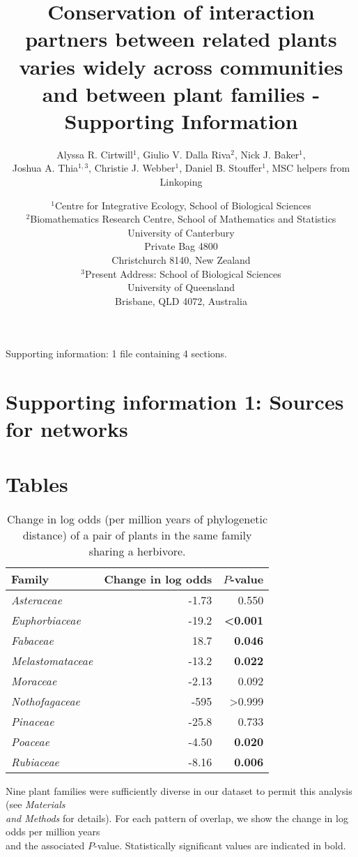 \documentclass[12pt]{article}
\title{Conservation of interaction partners between related plants varies widely across communities and between plant families - Supporting Information}
\author{Alyssa R. Cirtwill$^{1}$, Giulio V. Dalla Riva$^{2}$, Nick J. Baker$^{1}$,\\
 Joshua A. Thia$^{1,3}$, Christie J. Webber$^{1}$, Daniel B. Stouffer$^{1}$, MSC helpers from Linkoping}
\date{\small$^1$Centre for Integrative Ecology, School of Biological Sciences\\
    \medskip$^2$Biomathematics Research Centre, School of Mathematics and Statistics\\
            University of Canterbury\\Private Bag 4800\\
Christchurch 8140, New Zealand\\
\medskip$^3$Present Address: School of Biological Sciences\\
University of Queensland\\Brisbane, QLD 4072, Australia }
\begin{document}
\maketitle
\baselineskip=8.5mm
\begin{spacing}{1.0}


Supporting information: 1 file containing 4 sections.

\section*{Supporting information 1: Sources for networks}




\end{spacing}

\newpage

\renewcommand*{\bibfont}{\raggedright}



\newpage
\section*{Tables}

  \begin{table}[!h]
  \caption{\small Change in log odds (per million years of phylogenetic distance) of a pair of plants in the same family sharing a herbivore.}
  \label{family_slopes_ph}
  \begin{tabular}{|l  rr|}
  \hline
    Family & Change in log odds & $P$-value \\
    \hline
    \emph{Asteraceae} & -1.73 &  0.550 \\
    \emph{Euphorbiaceae} & -19.2 & \textbf{\textless0.001} \\
    \emph{Fabaceae} & 18.7 &  \textbf{0.046} \\
    \emph{Melastomataceae} & -13.2 & \textbf{0.022} \\
    \emph{Moraceae} & -2.13 & 0.092 \\
    \emph{Nothofagaceae} & -595 & \textgreater{0.999} \\
    \emph{Pinaceae} &  -25.8 & 0.733 \\
    \emph{Poaceae} & -4.50 & \textbf{0.020} \\
    \emph{Rubiaceae} & -8.16 &  \textbf{0.006} \\
  \hline
  \end{tabular}
  \smallskip
  \footnotesize

  Nine plant families were sufficiently diverse in our  dataset to permit this analysis
  (see \emph{Materials \\and Methods} for details). For each pattern of overlap, we show the change
  in log odds per million years \\and the associated $P$-value. Statistically significant values are
  indicated in bold. \\

  \end{table}
\end{document}
